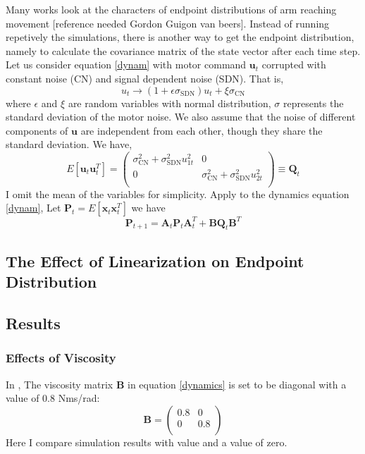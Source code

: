 Many works look at the characters of endpoint distributions of arm reaching movement [reference needed Gordon Guigon van beers]. Instead of running repetively the simulations, there is another way to get the endpoint distribution, namely to calculate the covariance matrix of the state vector after each time step. Let us consider equation \ref{dynam} with motor command $\bm{u}_t$ corrupted with constant noise (CN) and signal dependent noise (SDN). That is,
\begin{equation}
u_t \rightarrow (1 + \epsilon\sigma_{\text{SDN}}) u_t + \xi\sigma_{\text{CN}}
\end{equation}
where $\epsilon$ and $\xi$ are random variables with normal distribution, $\sigma$ represents the standard deviation of the motor noise. We also assume that the noise of different components of $\bm{u}$ are independent from each other, though they share the standard deviation. We have,
\begin{equation}
E[\bm{u}_t\bm{u}_t^T] = 
\left(\begin{matrix}
\sigma_{\text{CN}}^2 + 		\sigma_{\text{SDN}}^2 u_{1t}^2   &  0 \\
0  &   \sigma_{\text{CN}}^2 + 		\sigma_{\text{SDN}}^2 u_{2t}^2   \\
\end{matrix}\right)  \equiv \bm{Q}_t
\end{equation}
I omit the mean of the variables for simplicity. Apply to the dynamics equation \ref{dynam}, Let $\bm{P}_t = E[\bm{x}_{t}\bm{x}_{t}^T]$ we have
\begin{equation}
\bm{P}_{t+1} = \bm{A}_t \bm{P}_t\bm{A}_t^T + \bm{B}\bm{Q}_t\bm{B}^T
\end{equation}

\subsection{The Effect of Linearization on Endpoint Distribution}

\subsection{Results}\label{results}
\subsubsection{Effects of Viscosity}
In \cite{van2004role}, The viscosity matrix $\bm{B}$ in equation \ref{dynamics} is set to be diagonal with a value of 0.8 Nms/rad:
\begin{equation}
\bm{B} = 
\left(\begin{matrix}
0.8 & 0 \\
0 & 0.8 \\
\end{matrix}\right)
\end{equation}
Here I compare simulation results with \cite{van2004role} value and a value of zero.

